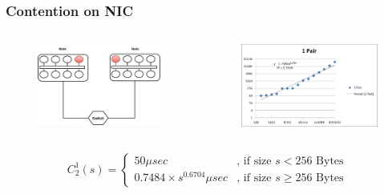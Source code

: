 \documentclass{beamer}
\begin{document}
\begin{frame}
\frametitle{Contention on NIC}
\begin{columns}[c]

\begin{figure}
\includegraphics[width=\linewidth,height=\textheight,keepaspectratio]{nodes2p1.jpg}
\end{figure}

\begin{figure}
\includegraphics[width=\linewidth,height=\textheight,keepaspectratio]{picture0.jpg}
\end{figure}

\end{columns}
\begin{block}{}
\begin{equation*}
C_2 ^1 (s)=\begin{cases}
50 \mu sec & \text{, if size }s < 256 \text{ Bytes} \\
0.7484\times s^{0.6704} \mu sec & \text{, if size } s \geq 256 \text{ Bytes}
\end{cases}
\end{equation*}
\end{block}

\end{frame}
\end{document}
